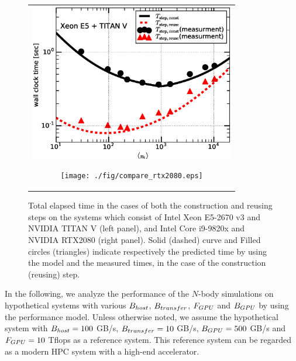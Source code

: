 \documentclass[dvipdfmx]{pasj01}
\begin{document}
\begin{figure}
  \begin{center}
    \begin{tabular}{c}
      
      \begin{minipage}{0.5\hsize}
        \begin{center}
          \includegraphics[width=9cm]{./fig/compare.eps}
        \end{center}
      \end{minipage}

      \begin{minipage}{0.5\hsize}
        \begin{center}
          \texttt{[image: ./fig/compare\_rtx2080.eps]}
        \end{center}
      \end{minipage}
      
    \end{tabular}
  \end{center}
  \caption{Total elapsed time in the cases of both the construction
    and reusing steps on the systems which consist of Intel Xeon
    E5-2670 v3 and NVIDIA TITAN V (left panel), and Intel Core
    i9-9820x and NVIDIA RTX2080 (right panel). Solid (dashed) curve
    and Filled circles (triangles) indicate respectively the predicted
    time by using the model and the measured times, in the case of the
    construction (reusing) step.}
  \label{fig:compare}
\end{figure}

In the following, we analyze the performance of the $N$-body
simulations on hypothetical systems with various ${B_{\rm host}}$,
${B_{\rm transfer}}$, ${F_{\rm GPU}}$ and ${B_{\rm GPU}}$ by using the
performance model. Unless otherwise noted, we assume the hypothetical
system with ${B_{\rm host}}=100$ GB/s, ${B_{\rm transfer}}=10$ GB/s,
${B_{\rm GPU}}=500$ GB/s and ${ F_{\rm GPU}}=10$ Tflops as a reference
system. This reference system can be regarded as a modern HPC system
with a high-end accelerator.
\end{document}
